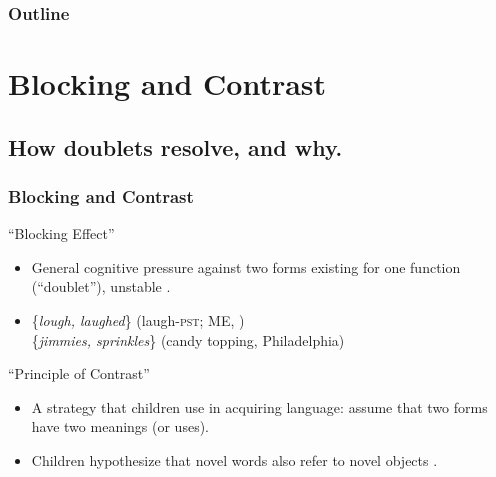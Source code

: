 \documentclass[hyperref={pdfpagelabels=false}]{beamer}
\begin{document}
\begin{frame}
\frametitle{Outline}
\tableofcontents
\end{frame}


\section{Blocking and Contrast}
\subsection{How doublets resolve, and why.}
\begin{frame}
\frametitle{Blocking and Contrast}
\begin{block}{``Blocking Effect'' \citep{aronoff1976}}
	\begin{itemize}
		\item General cognitive pressure against two forms existing for one function (``doublet''), unstable \citep{kroch1994}.
		\item[ ]\{\textsl{lough, laughed}\} (laugh-\textsc{pst}; ME, \citealt{taylor1994}) \\ \{\textsl{jimmies, sprinkles}\} (candy topping, Philadelphia)
	\end{itemize}
\end{block}
\begin{block}{``Principle of Contrast''}
	\begin{itemize}
		\item A strategy that children use in acquiring language: assume that two forms have two meanings (or uses)\citep[][{ \it inter alia}]{clark1987, clark1990}.
		\item Children hypothesize that novel words also refer to novel objects \citep[as in][among many other replications of the effect]{markmanwachtel1988}.
	\end{itemize}
\end{block}
\end{frame}
\end{document}
